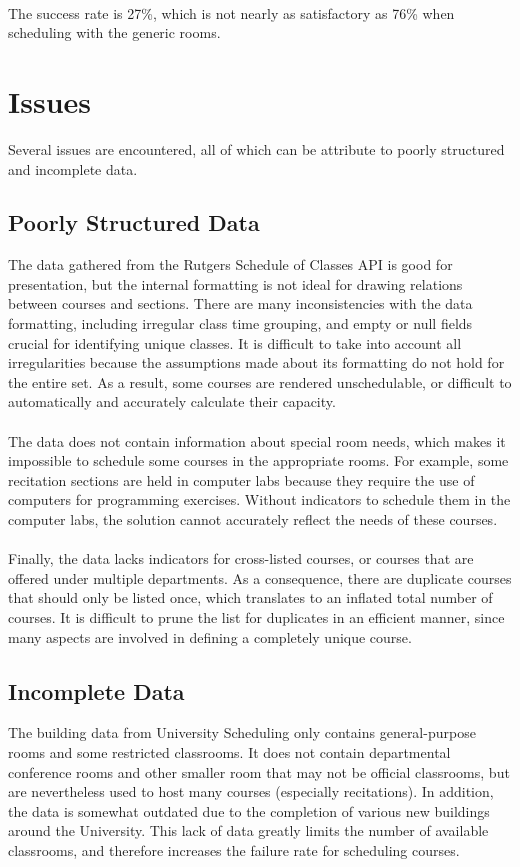 \documentclass[12pt]{article}
\begin{document}
\hfill\\
The success rate is 27\%, which is not nearly as satisfactory as 76\% when scheduling with the generic rooms.

\section{Issues}
Several issues are encountered, all of which can be attribute to poorly structured and incomplete data. 

\subsection{Poorly Structured Data}
The data gathered from the Rutgers Schedule of Classes API is good for presentation, but the internal formatting is not ideal for drawing relations between courses and sections. There are many inconsistencies with the data formatting, including irregular class time grouping, and empty or null fields crucial for identifying unique classes. It is difficult to take into account all irregularities because the assumptions made about its formatting do not hold for the entire set. As a result, some courses are rendered unschedulable, or difficult to automatically and accurately calculate their capacity. 
\\\\
The data does not contain information about special room needs, which makes it impossible to schedule some courses in the appropriate rooms. For example, some recitation sections are held in computer labs because they require the use of computers for programming exercises. Without indicators to schedule them in the computer labs, the solution cannot accurately reflect the needs of these courses. 
\\\\
Finally, the data lacks indicators for cross-listed courses, or courses that are offered under multiple departments. As a consequence, there are duplicate courses that should only be listed once, which translates to an inflated total number of courses. It is difficult to prune the list for duplicates in an efficient manner, since many aspects are involved in defining a completely unique course. 
	
\subsection{Incomplete Data}
The building data from University Scheduling only contains general-purpose rooms and some restricted classrooms. It does not contain departmental conference rooms and other smaller room that may not be official classrooms, but are nevertheless used to host many courses (especially recitations). In addition, the data is somewhat outdated due to the completion of various new buildings around the University. This lack of data greatly limits the number of available classrooms, and therefore increases the failure rate for scheduling courses.
\end{document}
